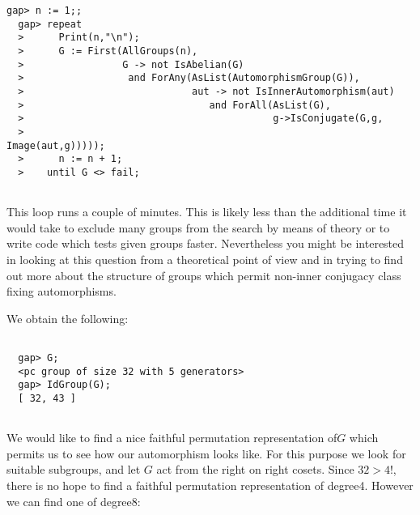 \documentclass[a4paper,11pt]{report}
\begin{document}
{{\begin{Verbatim}[fontsize=\small,frame=single,label=GAP session log]
  gap> n := 1;;
  gap> repeat
  >      Print(n,"\n");
  >      G := First(AllGroups(n),
  >                 G -> not IsAbelian(G)
  >                  and ForAny(AsList(AutomorphismGroup(G)),
  >                             aut -> not IsInnerAutomorphism(aut)
  >                                and ForAll(AsList(G),
  >                                           g->IsConjugate(G,g,
  >                                                          Image(aut,g)))));
  >      n := n + 1;
  >    until G <> fail;
  
\end{Verbatim}
 This loop runs a couple of minutes. This is likely less than the additional
time it would take to exclude many groups from the search by means of theory
or to write code which tests given groups faster. Nevertheless you might be
interested in looking at this question from a theoretical point of view and in
trying to find out more about the structure of groups which permit non-inner
conjugacy class fixing automorphisms. 

 We obtain the following:  
\begin{Verbatim}[fontsize=\small,frame=single,label=GAP session log]
  
  gap> G;
  <pc group of size 32 with 5 generators>
  gap> IdGroup(G);
  [ 32, 43 ]
  
\end{Verbatim}
 We would like to find a nice faithful permutation representation
of{\nobreakspace}$G$ which permits us to see how our automorphism looks like. For this purpose we
look for suitable subgroups, and let $G$ act from the right on right cosets. Since $32 > 4!$, there is no hope to find a faithful permutation representation of
degree{\nobreakspace}4. However we can find one of degree{\nobreakspace}8:            
\begin{Verbatim}[fontsize=\small,frame=single,label=GAP session log]
  

\end{Verbatim}}}
\end{document}
